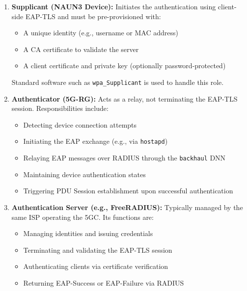 \begin{enumerate}
    \item {
        \textbf{Supplicant (\ac{NAUN3} Device):} Initiates the authentication using client-side \ac{EAP-TLS} and must be pre-provisioned with:
        \begin{itemize}
            \item A unique identity (e.g., username or \ac{MAC} address)
            \item A \ac{CA} certificate to validate the server
            \item A client certificate and private key (optionally password-protected)
        \end{itemize}
        Standard software such as \texttt{wpa\_Supplicant} is used to handle this role.
    }
    \item {
        \textbf{Authenticator (\ac{5G-RG}):} Acts as a relay, not terminating the \ac{EAP-TLS} session. Responsibilities include:
        \begin{itemize}
            \item Detecting device connection attempts
            \item Initiating the \ac{EAP} exchange (e.g., via \texttt{hostapd})
            \item Relaying \ac{EAP} messages over \ac{RADIUS} through the \texttt{backhaul} \ac{DNN}
            \item Maintaining device authentication states
            \item Triggering \ac{PDU} Session establishment upon successful authentication
        \end{itemize}
    }
    \item {
        \textbf{Authentication Server (e.g., FreeRADIUS):} Typically managed by the same \ac{ISP} operating the \ac{5GC}. Its functions are:
        \begin{itemize}
            \item Managing identities and issuing credentials
            \item Terminating and validating the \ac{EAP-TLS} session
            \item Authenticating clients via certificate verification
            \item Returning \ac{EAP}-Success or \ac{EAP}-Failure via \ac{RADIUS}
        \end{itemize}
    }
\end{enumerate}

